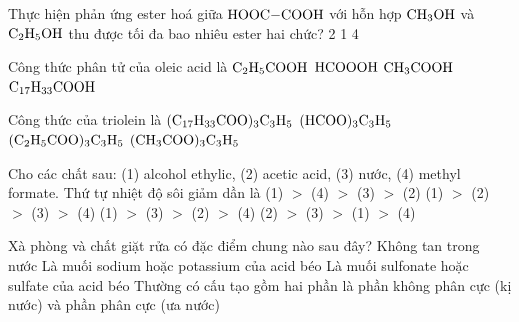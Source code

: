 \documentclass[12pt,a4paper]{article}
\begin{document}
\begin{ex}
Thực hiện phản ứng ester hoá giữa $\ce{HOOC-COOH}$ với hỗn hợp $\ce{CH3OH}$ và $\ce{C2H5OH}$ thu được tối đa bao nhiêu ester hai chức?
\choice
{2}
{}
{1}
{4}
\end{ex}

\begin{ex}
Công thức phân tử của oleic acid là
\choice
{$\ce{C2H5COOH}$}
{$\ce{HCOOOH}$}
{$\ce{CH3COOH}$}
{\True $\ce{C17H33COOH}$}
\end{ex}

\begin{ex}
Công thức của triolein là
\choice
{\True $\ce{(C17H33COO)3C3H5}$}
{$\ce{(HCOO)3C3H5}$}
{$\ce{(C2H5COO)3C3H5}$}
{$\ce{(CH3COO)3C3H5}$}
\end{ex}

\begin{ex}
Cho các chất sau: (1) alcohol ethylic, (2) acetic acid, (3) nước, (4) methyl formate. Thứ tự nhiệt độ sôi giảm dần là
\choice
{(1) $>$ (4) $>$ (3) $>$ (2)}
{(1) $>$ (2) $>$ (3) $>$ (4)}
{(1) $>$ (3) $>$ (2) $>$ (4)}
{\True (2) $>$ (3) $>$ (1) $>$ (4)}
\end{ex}

\begin{ex}
Xà phòng và chất giặt rửa có đặc điểm chung nào sau đây?
\choice
{Không tan trong nước}
{Là muối sodium hoặc potassium của acid béo}
{Là muối sulfonate hoặc sulfate của acid béo}
{\True Thường có cấu tạo gồm hai phần là phần không phân cực (kị nước) và phần phân cực (ưa nước)}
\end{ex}
\end{document}
